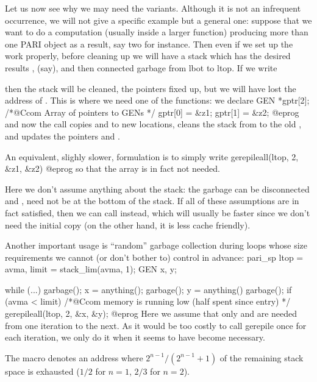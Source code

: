 Let us now see why we may need the  variants. Although it
is not an infrequent occurrence, we will not give a specific example but a
general one: suppose that we want to do a computation (usually inside a
larger function) producing more than one PARI object as a result, say two for
instance. Then even if we set up the work properly, before cleaning up we
will have a stack which has the desired results ,  (say), and
then connected garbage from lbot to ltop. If we write


\noindent
then the stack will be cleaned, the pointers fixed up, but we will have lost
the address of . This is where we need one of the 
functions: we declare
\bprog
  GEN *gptr[2]; /*@Ccom Array of pointers to GENs */
  gptr[0] = &z1; gptr[1] = &z2;
@eprog
\noindent and now the call  copies 
and  to new locations, cleans the stack from  to the old
, and updates the pointers  and .

An equivalent, slighly slower, formulation is to simply write
\bprog
  gerepileall(ltop, 2, &z1, &z2)
@eprog
so that the array  is in fact not needed.

Here we don't assume anything about the stack: the garbage can be
disconnected and ,  need not be at the bottom of the stack.
If all of these assumptions are in fact satisfied, then we can call
 instead, which will usually be faster since we don't
need the initial copy (on the other hand, it is less cache friendly).

Another important usage is ``random'' garbage collection during loops
whose size requirements we cannot (or don't bother to) control in advance:
\bprog
  pari_sp ltop = avma, limit = stack_lim(avma, 1);
  GEN x, y;

  while (...)
  {
    garbage(); x = anything();
    garbage(); y = anything()
    garbage();
    if (avma < limit) /*@Ccom memory is running low (half spent since entry) */
      gerepileall(ltop, 2, &x, &y);
  } 
@eprog
\noindent Here we assume that only  and  are needed from one
iteration to the next. As it would be too costly to call gerepile once for
each iteration, we only do it when it seems to have become necessary.

The macro  denotes an address where $2^{n-1} /
(2^{n-1}+1)$ of the remaining stack space is exhausted ($1/2$ for $n=1$,
$2/3$ for $n=2$).

